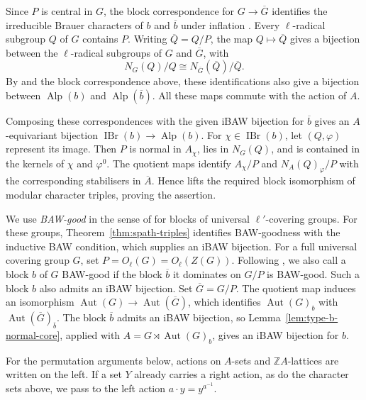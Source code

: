 \documentclass[10pt]{amsart}
\theoremstyle{definition}
\let\oldendproof\endproof
\renewenvironment{proof}[1][\proofname]{%
  \oldproof[\bfseries #1]%
}{\oldendproof}
\DeclareMathOperator{\Aut}{Aut}
\DeclareMathOperator{\IBr}{IBr}
\DeclareMathOperator{\Alp}{Alp}
\newcommand{\Z}{\mathbb Z}
\numberwithin{equation}{section}
\numberwithin{table}{section}
\begin{document}
\begin{proof}
Since $P$ is central in $G$, the block correspondence for
$G\longrightarrow\overline G$ identifies the irreducible Brauer
characters of $b$ and $\overline b$ under inflation
\cite[Theorem~9.10]{Navarro1998}.
Every $\ell$-radical subgroup $Q$ of $G$ contains $P$. Writing
$\overline Q=Q/P$, the map $Q\longmapsto\overline Q$ gives a bijection
between the $\ell$-radical subgroups of $G$ and $\overline G$, with
\[
 N_G(Q)/Q\cong N_{\overline G}(\overline Q)/\overline Q.
\]
By \cite[Lemma~2.1]{FengLiZhang2019} and the block correspondence above,
these identifications also give a bijection between $\Alp(b)$ and
$\Alp(\overline b)$. All these maps commute with the action of $A$.

Composing these correspondences with the given iBAW bijection for
$\overline b$ gives an $A$-equivariant bijection
$\IBr(b)\longrightarrow\Alp(b)$. For $\chi\in\IBr(b)$, let
$(Q,\varphi)$ represent its image. Then $P$ is
normal in $A_\chi$, lies in $N_G(Q)$, and is contained
in the kernels of $\chi$ and $\varphi^0$.
The quotient maps identify $A_\chi/P$ and $N_A(Q)_\varphi/P$ with
the corresponding stabilisers in $\overline A$.
Hence \cite[Lemma~3.14]{MartinezRizoRossi2026} lifts the required
block isomorphism of modular character triples, proving the assertion.
\end{proof}

We use \emph{BAW-good} in the sense of
\cite[Section~3.5]{FengLiZhang2022Jordan} for blocks of universal
$\ell'$-covering groups. For these groups,
Theorem~\ref{thm:spath-triples} identifies BAW-goodness with the
inductive BAW condition, which supplies an iBAW bijection.
For a full universal covering group $G$, set
$P=O_\ell(G)=O_\ell(Z(G))$. Following
\cite[Theorems~3.18 and~5.7]{FengLiZhang2022Jordan}, we also call a
block $b$ of $G$ BAW-good if the block $\overline b$ it dominates on
$G/P$ is BAW-good. Such a block $b$ also admits an iBAW bijection.
Set $\overline G=G/P$. The quotient map induces an isomorphism
$\Aut(G)\longrightarrow\Aut(\overline G)$, which identifies
$\Aut(G)_b$ with $\Aut(\overline G)_{\overline b}$. The block
$\overline b$ admits an iBAW bijection, so
Lemma~\ref{lem:type-b-normal-core}, applied with
$A=G\rtimes\Aut(G)_b$, gives an iBAW bijection for $b$.

For the permutation arguments below, actions on $A$-sets and $\Z A$-lattices
are written on the left.
If a set $Y$ already carries a right action, as do the character sets above,
we pass to the left action $a\cdot y=y^{a^{-1}}$.
\end{document}
